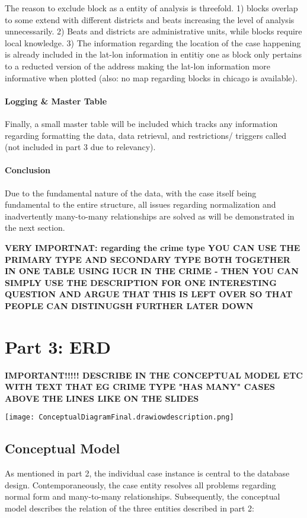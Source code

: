 \documentclass[a4paper]{article}
\begin{document}
The reason to exclude block as a entity of analysis is threefold. 1) blocks overlap to some extend with different districts and beats increasing the level of analysis unnecessarily. 2) Beats and districts are administrative units, while blocks require local knowledge. 3) The information regarding the location of the case happening is already included in the lat-lon information in entitiy one as block only pertains to a reducted version of the address making the lat-lon information more informative when plotted (also: no map regarding blocks in chicago is available). 

\paragraph{Logging \& Master Table} Finally, a small master table will be included which tracks any information regarding formatting the data, data retrieval, and restrictions/ triggers called (not included in part 3 due to relevancy).


\paragraph{Conclusion} Due to the fundamental nature of the data, with the case itself being fundamental to the entire structure, all issues regarding normalization and inadvertently many-to-many relationships are solved as will be demonstrated in the next section.


\textbf{VERY IMPORTNAT: regarding the crime type YOU CAN USE THE PRIMARY TYPE AND SECONDARY TYPE BOTH TOGETHER IN ONE TABLE USING IUCR IN THE CRIME - THEN YOU CAN SIMPLY USE THE DESCRIPTION FOR ONE INTERESTING QUESTION AND ARGUE THAT THIS IS LEFT OVER SO THAT PEOPLE CAN DISTINUGSH FURTHER LATER DOWN}

\section{Part 3: ERD}

\textbf{IMPORTANT!!!!! DESCRIBE IN THE CONCEPTUAL MODEL ETC WITH TEXT THAT EG CRIME TYPE "HAS MANY" CASES ABOVE THE LINES LIKE ON THE SLIDES}

\texttt{[image: ConceptualDiagramFinal.drawiowdescription.png]}

\subsection{Conceptual Model}
As mentioned in part 2, the individual case instance is central to the database design. Contemporaneously, the case entity resolves all problems regarding normal form and many-to-many relationships. Subsequently, the conceptual model describes the relation of the three entities described in part 2: 
\end{document}
